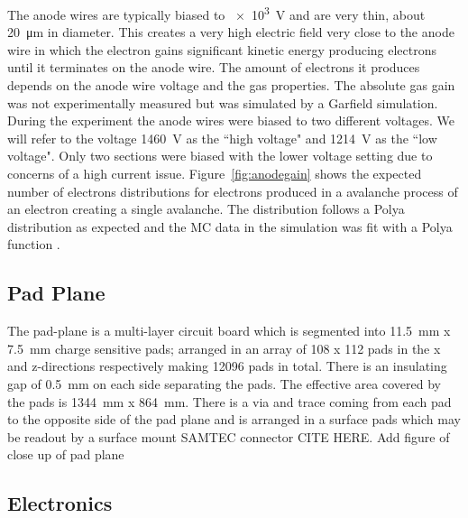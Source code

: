 The anode wires are typically biased to \SI{e3}{\volt} and are very thin, about \SI{20}{\micro\metre} in diameter. This creates a very high electric field very close to the anode wire in which the electron gains significant kinetic energy producing electrons until it terminates on the anode wire. The amount of electrons it produces depends on the anode wire voltage and the gas properties. The absolute gas gain was not experimentally measured but was simulated by a Garfield simulation. During the experiment the anode wires were biased to two different voltages. We will refer to the voltage \SI{1460}{\volt} as the ``high voltage" and \SI{1214}{\volt} as the ``low voltage". Only two sections were biased with the lower voltage setting due to concerns of a high current issue. Figure~\ref{fig:anodegain} shows the expected number of electrons distributions for electrons produced in a avalanche process of an electron creating a single avalanche. The distribution follows a Polya distribution as expected and the MC data in the simulation was fit with a Polya function \cite{blumrol}. 



\subsection{Pad Plane}
The pad-plane is a multi-layer circuit board which is segmented into \SI{11.5}{\milli\metre} x \SI{7.5}{\milli\metre} charge sensitive pads; arranged in an array of 108 x 112 pads in the x and z-directions respectively making 12096 pads in total. There is an insulating gap of \SI{0.5}{\milli\metre} on each side separating the pads. The effective area covered by the pads is \SI{1344}{\milli\metre} x \SI{864}{\milli\metre}. There is a via and trace coming from each pad to the opposite side of the pad plane and is arranged in a surface pads which may be readout by a surface mount SAMTEC connector CITE HERE. 
Add figure of close up of pad plane 



\subsection{Electronics}

